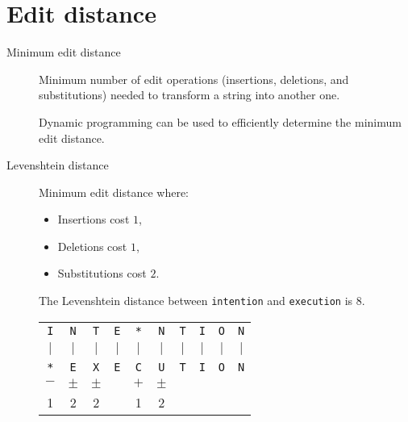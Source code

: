 \section{Edit distance}

\begin{description}
    \item[Minimum edit distance] 
        Minimum number of edit operations (insertions, deletions, and substitutions) needed to transform a string into another one.

        \begin{remark}
            Dynamic programming can be used to efficiently determine the minimum edit distance.
        \end{remark}

    \item[Levenshtein distance] 
        Minimum edit distance where:
        \begin{itemize}
            \item Insertions cost $1$,
            \item Deletions cost $1$,
            \item Substitutions cost $2$.
        \end{itemize}

        \begin{example}
            The Levenshtein distance between \texttt{intention} and \texttt{execution} is $8$.
            \begin{table}[H]
                \centering
                \begin{tabular}{cccccccccc}
                    \texttt{I} & \texttt{N} & \texttt{T} & \texttt{E} & \texttt{*} & \texttt{N} & \texttt{T} & \texttt{I} & \texttt{O} & \texttt{N} \\
                    $\vert$ & $\vert$ & $\vert$ & $\vert$ & $\vert$ & $\vert$ & $\vert$ & $\vert$ & $\vert$ & $\vert$ \\
                    \texttt{*} & \texttt{E} & \texttt{X} & \texttt{E} & \texttt{C} & \texttt{U} & \texttt{T} & \texttt{I} & \texttt{O} & \texttt{N} \\
                    $-$ & $\pm$ & $\pm$ &  & $+$ & $\pm$ \\
                    1 & 2 & 2 &  & 1 & 2 \\
                \end{tabular}
            \end{table}
        \end{example}
\end{description}

